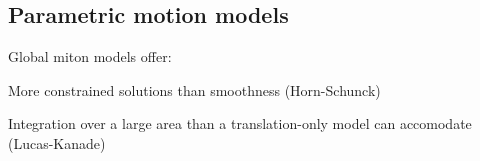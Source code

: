 \begin{compactdesc}
\section{Parametric motion models}
Global miton models offer:\\
\begin{enumerate*}[label=\protect\circled{\arabic*},itemjoin=]
	\item More constrained solutions than smoothness (Horn-Schunck)\\
	\item Integration over a large area than a translation-only model can accomodate (Lucas-Kanade)
\end{enumerate*}
\end{compactdesc}
